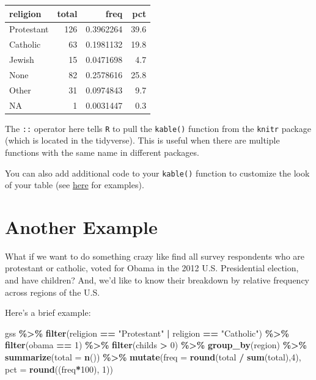 \documentclass[
]{book}
\newenvironment{Shaded}{\begin{snugshade}}{\end{snugshade}}
\newcommand{\AttributeTok}[1]{\textcolor[rgb]{0.13,0.29,0.53}{#1}}
\newcommand{\DecValTok}[1]{\textcolor[rgb]{0.00,0.00,0.81}{#1}}
\newcommand{\FunctionTok}[1]{\textcolor[rgb]{0.13,0.29,0.53}{\textbf{#1}}}
\newcommand{\NormalTok}[1]{#1}
\newcommand{\SpecialCharTok}[1]{\textcolor[rgb]{0.81,0.36,0.00}{\textbf{#1}}}
\newcommand{\StringTok}[1]{\textcolor[rgb]{0.31,0.60,0.02}{#1}}
\begin{document}
\begin{tabular}{l|r|r|r}
\hline
religion & total & freq & pct\\
\hline
Protestant & 126 & 0.3962264 & 39.6\\
\hline
Catholic & 63 & 0.1981132 & 19.8\\
\hline
Jewish & 15 & 0.0471698 & 4.7\\
\hline
None & 82 & 0.2578616 & 25.8\\
\hline
Other & 31 & 0.0974843 & 9.7\\
\hline
NA & 1 & 0.0031447 & 0.3\\
\hline
\end{tabular}

The \texttt{::} operator here tells \texttt{R} to pull the \texttt{kable()} function from the \texttt{knitr} package (which is located in the tidyverse). This is useful when there are multiple functions with the same name in different packages.

You can also add additional code to your \texttt{kable()} function to customize the look of your table (see \href{https://cran.r-project.org/web/packages/kableExtra/vignettes/awesome_table_in_html.html}{here} for examples).

\hypertarget{another-example}{%
\section{Another Example}\label{another-example}}

What if we want to do something crazy like find all survey respondents who are protestant or catholic, voted for Obama in the 2012 U.S. Presidential election, and have children? And, we'd like to know their breakdown by relative frequency across regions of the U.S.

Here's a brief example:

\begin{Shaded}
\begin{Highlighting}[]
\NormalTok{gss }\SpecialCharTok{\%\textgreater{}\%}
  \FunctionTok{filter}\NormalTok{(religion }\SpecialCharTok{==} \StringTok{"Protestant"} \SpecialCharTok{|}\NormalTok{ religion }\SpecialCharTok{==} \StringTok{"Catholic"}\NormalTok{) }\SpecialCharTok{\%\textgreater{}\%}
  \FunctionTok{filter}\NormalTok{(obama }\SpecialCharTok{==} \DecValTok{1}\NormalTok{) }\SpecialCharTok{\%\textgreater{}\%}
  \FunctionTok{filter}\NormalTok{(childs }\SpecialCharTok{\textgreater{}} \DecValTok{0}\NormalTok{) }\SpecialCharTok{\%\textgreater{}\%}
  \FunctionTok{group\_by}\NormalTok{(region) }\SpecialCharTok{\%\textgreater{}\%}
  \FunctionTok{summarize}\NormalTok{(}\AttributeTok{total =} \FunctionTok{n}\NormalTok{()) }\SpecialCharTok{\%\textgreater{}\%}
  \FunctionTok{mutate}\NormalTok{(}\AttributeTok{freq =} \FunctionTok{round}\NormalTok{(total }\SpecialCharTok{/} \FunctionTok{sum}\NormalTok{(total),}\DecValTok{4}\NormalTok{),}
         \AttributeTok{pct =} \FunctionTok{round}\NormalTok{((freq}\SpecialCharTok{*}\DecValTok{100}\NormalTok{), }\DecValTok{1}\NormalTok{))}
\end{Highlighting}
\end{Shaded}
\end{document}
